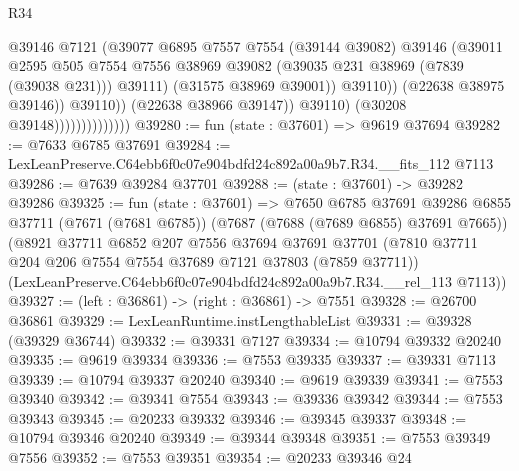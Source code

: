 \begin{lexlean}{R34}
\begin{coremodule}
                                            @39146
                                            @7121
                                            (@39077
                                              @6895
                                              @7557
                                              @7554
                                              (@39144 @39082)
                                              @39146
                                              (@39011
                                                @2595
                                                @505
                                                @7554
                                                @7556
                                                @38969
                                                @39082
                                                (@39035 @231 @38969 (@7839 (@39038 @231)))
                                                @39111)
                                              (@31575 @38969 @39001))
                                            @39110))
                                        (@22638 @38975 @39146))
                                      @39110))
                                  (@22638 @38966 @39147))
                                @39110)
                              (@30208 @39148))))))))))))))
@39280 := fun (state : @37601) => @9619 @37694
@39282 := @7633 @6785 @37691
@39284 := LexLeanPreserve.C64ebb6f0c07e904bdfd24c892a00a9b7.R34.__fits_112 @7113
@39286 := @7639 @39284 @37701
@39288 := (state : @37601) -> @39282 @39286
@39325 := fun (state : @37601) =>
  @7650
    @6785
    @37691
    @39286
    @6855
    @37711
    (@7671 (@7681 @6785))
    (@7687 (@7688 (@7689 @6855) @37691 @7665))
    (@8921
      @37711
      @6852
      @207
      @7556
      @37694
      @37691
      @37701
      (@7810 @37711 @204 @206 @7554 @7554 @37689 @7121 @37803 (@7859 @37711))
      (LexLeanPreserve.C64ebb6f0c07e904bdfd24c892a00a9b7.R34.__rel_113 @7113))
@39327 := (left : @36861) -> (right : @36861) -> @7551
@39328 := @26700 @36861
@39329 := LexLeanRuntime.instLengthableList
@39331 := @39328 (@39329 @36744)
@39332 := @39331 @7127
@39334 := @10794 @39332 @20240
@39335 := @9619 @39334
@39336 := @7553 @39335
@39337 := @39331 @7113
@39339 := @10794 @39337 @20240
@39340 := @9619 @39339
@39341 := @7553 @39340
@39342 := @39341 @7554
@39343 := @39336 @39342
@39344 := @7553 @39343
@39345 := @20233 @39332
@39346 := @39345 @39337
@39348 := @10794 @39346 @20240
@39349 := @39344 @39348
@39351 := @7553 @39349 @7556
@39352 := @7553 @39351
@39354 := @20233 @39346 @24

\end{coremodule}
\end{lexlean}
